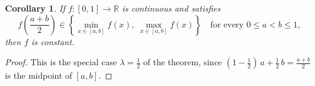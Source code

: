 \documentclass[12pt]{article}
\newtheorem{corollary}{Corollary}
\begin{document}
\begin{corollary}
If $f : [0,1] \to \mathbb{R}$ is continuous and satisfies
\[
  f\!\left(\frac{a+b}{2}\right) \in
  \left\{\min_{x \in [a,b]} f(x),\; \max_{x \in [a,b]} f(x)\right\}
  \quad \text{for every } 0 \le a < b \le 1,
\]
then $f$ is constant.
\end{corollary}

\begin{proof}
This is the special case $\lambda = \tfrac{1}{2}$ of the theorem, since
$(1 - \tfrac{1}{2})\,a + \tfrac{1}{2}\,b = \tfrac{a+b}{2}$ is the midpoint
of $[a,b]$.
\end{proof}
\end{document}
